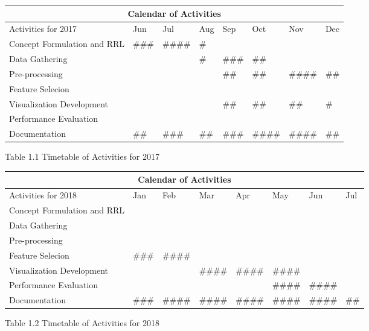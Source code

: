 \begin{center}
\begin{tabular}{ |p{3.7cm}|p{1.2cm}|p{1.2cm}|p{1.2cm}|p{1.2cm}|p{1.2cm}|p{1.2cm}|p{1.2cm}| }
 \hline
 \multicolumn{8}{|c|}{Calendar of Activities} \\
 \hline
 Activities for 2017& Jun&Jul&Aug&Sep&Oct&Nov&Dec\\
 \hline
Concept Formulation and RRL&\#\#\#& \#\#\#\#&\#&&&&
 \\
\hline
Data Gathering&&&\#&\#\#\#&\#\#&&
 \\
\hline
Pre-processing&&&&\#\#&\#\#&\#\#\#\#&\#\#
 \\
 \hline
Feature Selecion&&&&&&&
 \\
 \hline
Visualization Development&&&&\#\#&\#\#&\#\#&\#
 \\
 \hline
Performance Evaluation&&&&&&&
 \\
 \hline
Documentation&\#\#&\#\#\#& \#\#&\#\#\#&\#\#\#\#&\#\#\#\#&\#\#
 \\
 \hline
\end{tabular}
\end{center}
Table 1.1 Timetable of Activities for 2017

\begin{center}
\begin{tabular}{ |p{3.7cm}|p{1.2cm}|p{1.2cm}|p{1.2cm}|p{1.2cm}|p{1.2cm}|p{1.2cm}|p{1.2cm}| }
 \hline
 \multicolumn{8}{|c|}{Calendar of Activities} \\
 \hline
 Activities for 2018& Jan&Feb&Mar&Apr&May&Jun&Jul\\
 \hline
Concept Formulation and RRL&&&&&&&
 \\
\hline
Data Gathering&&&&&&&
 \\
\hline
Pre-processing&&&&&&&    
 \\
 \hline
Feature Selecion&\#\#\#&\#\#\#\#&&&&&    
 \\
 \hline
Visualization Development&&&\#\#\#\#&\#\#\#\#& \#\#\#\#&& 
 \\
 \hline
Performance Evaluation&&&&&\#\#\#\#&\#\#\#\#&
 \\
 \hline
Documentation&\#\#\#&\#\#\#\#&\#\#\#\#&\#\#\#\#&\#\#\#\#&\#\#\#\#&\#\#
 \\
 \hline
\end{tabular}
\end{center}
Table 1.2 Timetable of Activities for 2018